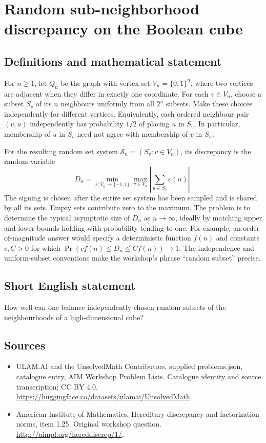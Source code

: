\documentclass[11pt,a4paper]{article}
\begin{document}
\section*{Random sub-neighborhood discrepancy on the Boolean cube}\label{statement}

\subsection{Definitions and mathematical statement}
For $n\ge1$, let $Q_n$ be the graph with vertex set $V_n=\{0,1\}^n$,
where two vertices are adjacent when they differ in exactly one
coordinate. For each $v\in V_n$, choose a subset $S_v$ of its $n$
neighbours uniformly from all $2^n$ subsets. Make these choices
independently for different vertices. Equivalently, each ordered
neighbour pair $(v,u)$ independently has probability $1/2$ of placing
$u$ in $S_v$. In particular, membership of $u$ in $S_v$ need not agree
with membership of $v$ in $S_u$.

For the resulting random set system $\mathcal S_n=(S_v:v\in V_n)$,
its discrepancy is the random variable
\[
 D_n=\min_{\varepsilon:V_n\to\{-1,1\}}
        \max_{v\in V_n}\left|\sum_{u\in S_v}\varepsilon(u)\right|.
\]
The signing is chosen after the entire set system has been sampled and
is shared by all its sets. Empty sets contribute zero to the maximum.
The problem is to determine the typical asymptotic size of $D_n$ as
$n\to\infty$, ideally by matching upper and lower bounds holding with
probability tending to one. For example, an order-of-magnitude answer
would specify a deterministic function $f(n)$ and constants $c,C>0$
for which $\Pr(c f(n)\le D_n\le C f(n))\to1$.
The independence and uniform-subset conventions make the workshop's
phrase ``random subset'' precise.
\subsection{Short English statement}
How well can one balance independently chosen random subsets of the neighbourhoods of a high-dimensional cube?
\subsection{Sources}
\begin{itemize}
\item[S1] ULAM.AI and the UnsolvedMath Contributors, supplied problems.json, catalogue entry, AIM Workshop Problem Lists. Catalogue identity and source transcription; CC BY 4.0.
\url{https://huggingface.co/datasets/ulamai/UnsolvedMath}.
\item[S2] American Institute of Mathematics, Hereditary discrepancy and factorization norms, item 1.25. Original workshop question.
\url{http://aimpl.org/hereddiscrep/1/}.
\end{itemize}
\end{document}
